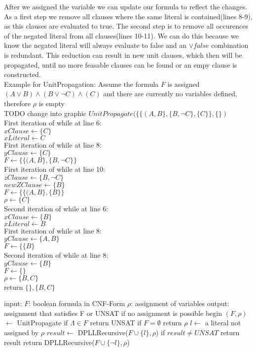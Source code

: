 After we assigned the variable we can update our formula to reflect the changes. As a first step we remove all clauses where the same literal is contained(lines 8-9), as this clauses are evaluated to true. The second step is to remove all occurences of the negated literal from all clauses(lines 10-11). We can do this because we know the negated literal will always evaluate to false and an $\lor false$ combination is redundant.
This reduction can result in new unit clauses, which then will be propagated, until no more feasable clauses can be found or an empy clause is constructed.\\
Example for UnitPropagation: 
Assume the formula $F$ is assigned $(A \lor B ) \land (B \lor \lnot C) \land (C)$ and there are currently no variables defined, therefore $\rho$ is empty\\
TODO change into graphic
$UnitPropagate(\{\{(A,B\}, \{B, \lnot C\},\{C\}\}, \{\})$\\
First iteration of while at line 6: \\
$xClause \gets \{C\}$\\
$xLiteral \gets C$\\
First iteration of while at line 8:\\
$yClause \gets \{C\}$\\
$F \gets \{\{(A,B\}, \{B, \lnot C\}\}$\\
First iteration of while at line 10:\\
$zClause \gets \{B, \lnot C\}$ \\
$newZClause \gets \{B\}$\\
$F \gets \{\{(A,B\}, \{B\}\}$ \\
$\rho \gets \{C\}$\\
Second iteration of while at line 6: \\
$xClause \gets \{B\}$\\
$xLiteral \gets B$\\
First iteration of while at line 8:\\
$yClause \gets \{A,B\}$\\
$F \gets \{\{B\}$\\
Second iteration of while at line 8:\\
$yClause \gets \{B\}$\\
$F \gets \{\}$\\
$\rho \gets \{B, C\}$\\
return $\{\}, \{B, C\}$

\begin{algorithm}[caption={DPLLRecursive}, label={algDPLLRecursive}]
 input: $F$: boolean formula in CNF-Form
	$\rho$: assignment of variables
 output: assignment that satisfies F or 
	UNSAT if no assignment is possible
 begin
   $(F, \rho)$  $\gets$ UnitPropagate
   if $\Lambda \in F$
	return UNSAT
   if $F = \emptyset$
	return $\rho$
   $l \gets$ a literal not assigned by $\rho$
   $result \gets$ DPLLRecursive($F \cup \{l\}, \rho$)
   if $result \neq UNSAT$
	return result
   return DPLLRecursive($F \cup \{\lnot l\}, \rho$)
\end{algorithm}

